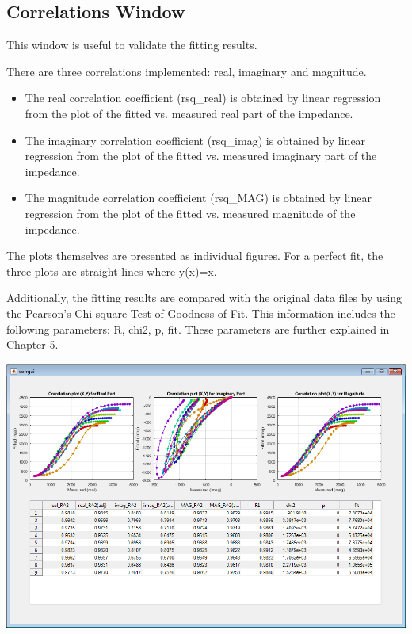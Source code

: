 \documentclass[10pt,a4paper,oneside]{book}
\begin{document}
\subsection{Correlations Window}

This window is useful to validate the fitting results. 

There are three correlations implemented: real, imaginary and magnitude. 

\begin{itemize}
\item The real correlation coefficient (rsq\_real) is obtained by linear regression from the plot of the fitted vs. measured real part of the impedance. 
\item The imaginary correlation coefficient (rsq\_imag) is obtained by linear regression from the plot of the fitted vs. measured imaginary part of the impedance.
\item The magnitude correlation coefficient (rsq\_MAG) is obtained by linear regression from the plot of the fitted vs. measured magnitude of the impedance.	
\end{itemize}

The plots themselves are presented as individual figures. For a perfect fit, the three plots are straight lines where y(x)=x.

Additionally, the fitting results are compared with the original data files by using the Pearson's Chi-square Test of Goodness-of-Fit. This information includes the following parameters: R, chi2, p, fit. These parameters are further explained in Chapter 5.

\includegraphics[width=15cm]{correlations.png}
\end{document}
